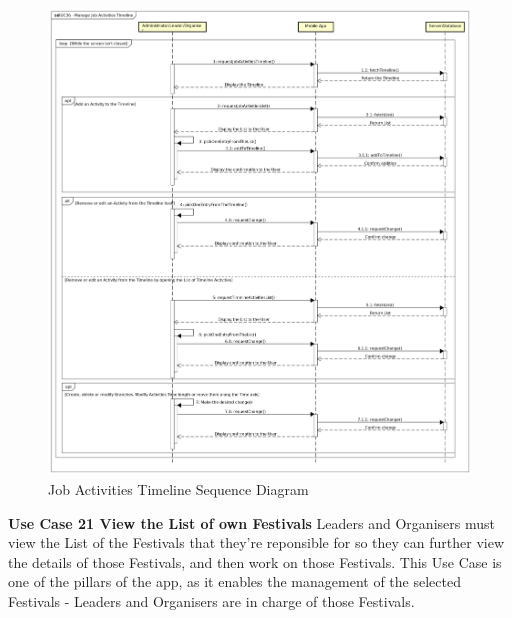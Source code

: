 				\begin{figure}[H]
					\includegraphics[width=\linewidth]{diagrams/sd-diag2-jat.png}
					\caption{Job Activities Timeline Sequence Diagram}
					\label{fig:sd2_job_activities_timeline}
				\end{figure}
				
				\textbf{Use Case 21 View the List of own Festivals}
				Leaders and Organisers must view the List of the Festivals that they're reponsible for so they can further view the details of those Festivals, and then work on those Festivals.
				This Use Case is one of the pillars of the app, as it enables the management of the selected Festivals - Leaders and Organisers are in charge of those Festivals.

